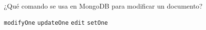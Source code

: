 \question[1] ¿Qué comando se usa en MongoDB para modificar un documento?
\begin{choices}
\choice \texttt{modifyOne}
\CorrectChoice \texttt{updateOne}
\choice \texttt{edit}
\choice \texttt{setOne}
\end{choices}